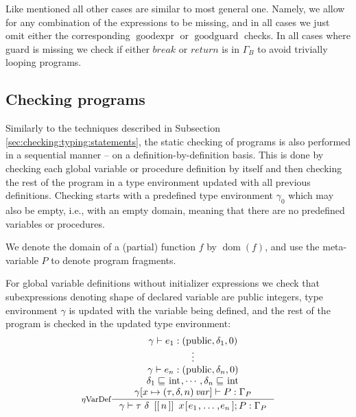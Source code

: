 \documentclass[a4paper, 10pt, draft]{report}
\newcommand{\mycode}[1]{\ensuremath{\mbox{\lstinline{#1}}}}
\begin{document}
Like mentioned all other cases are similar to most general one. Namely, we
allow for any combination of the expressions to be missing, and in all cases we
just omit either the corresponding $\operatorname{goodexpr}$ or
$\operatorname{goodguard}$ checks. In all cases where guard is missing we check
if either $break$ or $return$ is in $\Gamma_B$ to avoid trivially looping
programs.

\subsection{Checking programs}\label{sec:checking:typing:programs}

Similarly to the techniques described in Subsection
\ref{sec:checking:typing:statements}, the static checking of programs is also
performed in a sequential manner -- on a definition-by-definition basis. This
is done by checking each global variable or procedure definition by itself and
then checking the rest of the program in a type environment updated with all
previous definitions. Checking starts with a predefined type environment
$\gamma_0$ which may also be empty, i.e., with an empty domain, meaning that
there are no predefined variables or procedures.

We denote the domain of a (partial) function $f$ by
$\operatorname{dom}\!\left(f\right)$, and use the meta-variable $P$ to denote
program fragments. 

For global variable definitions without initializer expressions we check that
subexpressions denoting shape of declared variable are public integers,
type environment $\gamma$ is updated with the variable being defined, and the
rest of the program is checked in the updated type environment:
\[ \inference[$\eta$VarDef]{
  \gamma |- e_1 : \left( \mycode{public}, \delta_1, 0 \right) \\
  \vdots \\
  \gamma |- e_n : \left( \mycode{public}, \delta_n, 0 \right) \\
  \delta_1 \sqsubseteq \mycode{int}, \cdots, \delta_n \sqsubseteq \mycode{int} \\
  \gamma[x \mapsto \left( \tau, \delta, n \right) \mathit{var}] |- P : \Gamma_P
}{
  \gamma |- \tau\ \delta\ \mycode{[[}n\mycode{]]}\ x\mycode{[} e_1 \mycode{,} \ldots \mycode{,} e_n  \mycode{];} P : \Gamma_P
} \]
\end{document}
